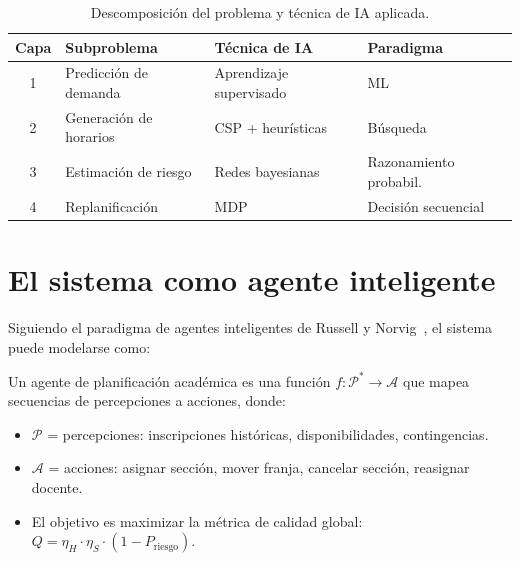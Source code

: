 \documentclass[12pt,twoside]{report}
\theoremstyle{definition}
\begin{document}
\begin{table}[H]
\centering
\caption{Descomposici\'on del problema y t\'ecnica de IA aplicada.}
\label{tab:descomp}
\begin{tabular}{clll}
\toprule
\textbf{Capa} & \textbf{Subproblema} & \textbf{T\'ecnica de IA} & \textbf{Paradigma} \\
\midrule
1 & Predicci\'on de demanda   & Aprendizaje supervisado & ML \\
2 & Generaci\'on de horarios  & CSP + heur\'isticas     & B\'usqueda \\
3 & Estimaci\'on de riesgo    & Redes bayesianas         & Razonamiento probabil. \\
4 & Replanificaci\'on         & MDP                      & Decisi\'on secuencial \\
\bottomrule
\end{tabular}
\end{table}

\section{El sistema como agente inteligente}

Siguiendo el paradigma de agentes inteligentes de Russell y Norvig~\cite{russell2020},
el sistema puede modelarse como:

\begin{definicion}
Un agente de planificaci\'on acad\'emica es una funci\'on
$f: \mathcal{P}^* \to \mathcal{A}$ que mapea secuencias de percepciones a acciones,
donde:
\begin{itemize}
  \item $\mathcal{P}$ = percepciones: inscripciones hist\'oricas, disponibilidades,
    contingencias.
  \item $\mathcal{A}$ = acciones: asignar secci\'on, mover franja, cancelar secci\'on,
    reasignar docente.
  \item El objetivo es maximizar la m\'etrica de calidad global:
    $Q = \eta_H \cdot \eta_S \cdot (1 - P_{\text{riesgo}})$.
\end{itemize}
\end{definicion}
\end{document}
